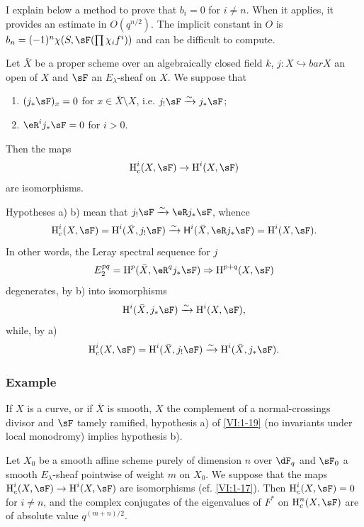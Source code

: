 I explain below a method to prove that $b_i=0$ for $i\ne n$.
When it applies, it provides an estimate in $O(q^{n/2})$. The
implicit constant in $O$ is $b_n=(-1)^n \chi(S,\sF(\prod \chi_i f^i))$ and
can be difficult to compute. 





\begin{proposition_}\label{VI:1-19}
Let $\bar X$ be a proper scheme over an algebraically closed field $k$,
$j:X\hookrightarrow bar X$ an open of $X$ and $\sF$ an $E_\lambda$-sheaf
on $X$. We suppose that
\begin{enumerate}[\indent a)]
  \item $(j_\ast\sF)_x = 0$ for $x\in \bar X\setminus X$, i.e.
    $j_!\sF\iso j_\ast\sF$;
  \item $\eR^i j_\ast \sF = 0$ for $i>0$.
\end{enumerate}
Then the maps 
\[
  \h_c^i(X,\sF) \to \h^i(X,\sF)
\]
are isomorphisms.
\end{proposition_}

Hypotheses a) b) mean that $j_! \sF \iso \eR j_\ast \sF$, whence 
\[
  \h_c^i(X,\sF) = \h^i(\bar X,j_!\sF) \iso \hh^i(\bar X,\eR j_\ast \sF) = \h^i(X,\sF) \text{.}
\]
In other words, the Leray spectral sequence for $j$ 
\[
  E_2^{pq} = \h^p(\bar X,\eR^q j_\ast \sF) \Rightarrow \h^{p+q}(X,\sF) 
\]
degenerates, by b) into isomorphisms 
\[
  \h^i(\bar X,j_\ast\sF) \iso \h^i(X,\sF) \text{,}
\]
while, by a) 
\[
  \h_c^i(X,\sF) = \h^i(\bar X,j_!\sF) \iso \h^i(\bar X,j_\ast\sF) \text{.}
\]





\subsubsection{Example}\label{VI:1-19-1}

If $X$ is a curve, or if $\bar X$ is smooth, $X$ the complement of a
normal-crossings divisor and $\sF$ tamely ramified,
hypothesis a) of \ref{VI:1-19} (no invariants under local monodromy)
implies hypothesis b). 





\begin{proposition_}\label{VI:1-20}
Let $X_0$ be a smooth affine scheme purely of dimension $n$ over $\dF_q$ and
$\sF_0$ a smooth $E_\lambda$-sheaf pointwise of weight $m$ on $X_0$. We
suppose that the maps $\h_c^i(X,\sF) \to \h^i(X,\sF)$ are
isomorphisms (cf. \ref{VI:1-17}). Then $\h_c^i(X,\sF) = 0$ for $i\ne n$, and
the complex conjugates of the eigenvalues of $F^\ast$ on $\h_c^n(X,\sF)$
are of absolute value $q^{(m+n)/2}$.
\end{proposition_}

